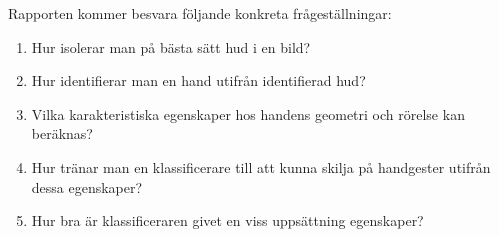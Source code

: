 \documentclass[../rapport_MVEX01-11-05]{subfiles}
\begin{document}


Rapporten kommer besvara följande konkreta frågeställningar:
\begin{enumerate}
    \item Hur isolerar man på bästa sätt hud i en bild?
    \item Hur identifierar man en hand utifrån identifierad hud?
		\item Vilka karakteristiska egenskaper hos handens geometri och rörelse
					kan beräknas?
    \item Hur tränar man en klassificerare till att kunna skilja på
					handgester utifrån dessa egenskaper?
    \item Hur bra är klassificeraren givet en viss uppsättning egenskaper?
\end{enumerate}
\end{document}

